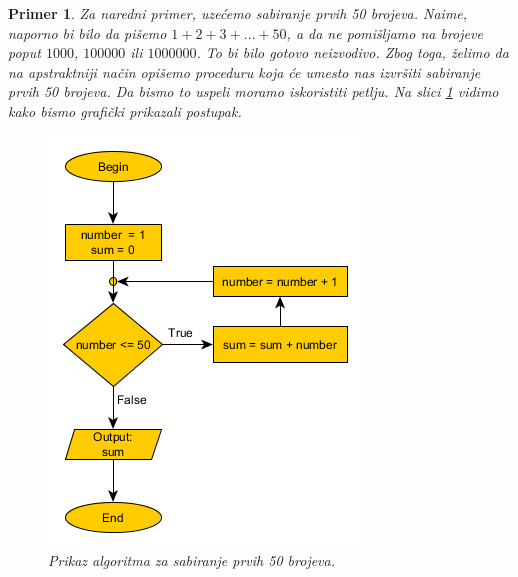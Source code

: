\documentclass[a4paper]{article}
\newtheorem{primer}{Primer}[section]
\begin{document}
\begin{primer}
Za naredni primer, uzećemo sabiranje prvih 50 brojeva. Naime, naporno bi bilo da pišemo $1+2+3+...+50$, a da ne pomišljamo na brojeve poput $1000$, $100 000$ ili $1 000 000$. To bi bilo gotovo neizvodivo. Zbog toga, želimo da na apstraktniji način opišemo proceduru koja će umesto nas izvršiti sabiranje prvih 50 brojeva. Da bismo to uspeli moramo iskoristiti petlju. Na slici \ref{fig:alg2} vidimo kako bismo grafički prikazali postupak.
\begin{figure}[h!]
\begin{center}
\includegraphics[scale=0.5]{pictures/algorithm-flow.png}
\end{center}
\caption{Prikaz algoritma za sabiranje prvih 50 brojeva.}
\label{fig:alg2}
\end{figure}
\end{primer}
\end{document}
